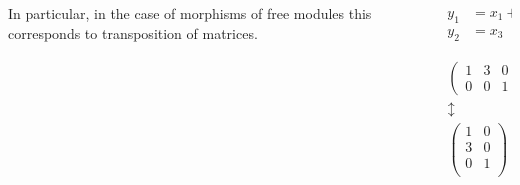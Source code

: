 \documentclass[10pt]{beamer}
\newcommand{\0}{\mathcal{O}}  %
\begin{document}
\begin{frame}
\begin{columns}
\begin{column}{0.6\textwidth}
      \begin{center}
        In particular, in the case of morphisms of free modules this
        corresponds to transposition of matrices.
      \end{center}
      
    \end{column}    
    \begin{column}{0.4\textwidth}
      \begin{align*}
        y_1 &= x_1 + 3x_2\\
        y_2 &= x_3
      \end{align*}
      
      \Large
      \begin{gather*}
        \begin{pmatrix}
          1 & 3 & 0\\
          0 & 0 & 1
        \end{pmatrix}\\
        \updownarrow\\
        \begin{pmatrix}
          1 & 0\\
          3 & 0\\
          0 & 1\\
        \end{pmatrix}
      \end{gather*}
    \end{column}
  \end{columns}

\end{frame}

\end{document}
